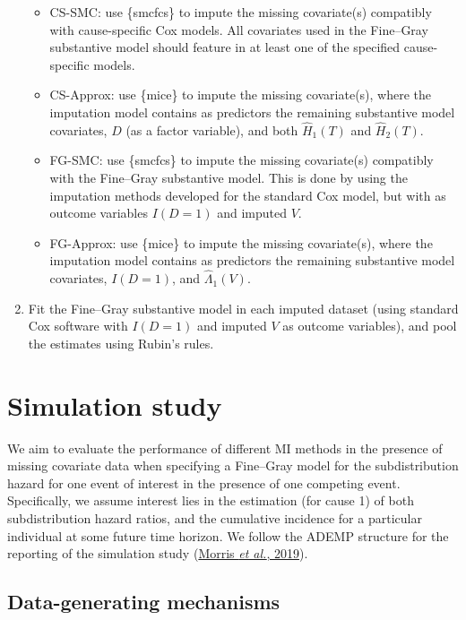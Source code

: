 \documentclass[
  letterpaper,
  DIV=11,
  numbers=noendperiod]{scrreprt}
\providecommand{\tightlist}{%
  \setlength{\itemsep}{0pt}\setlength{\parskip}{0pt}}\usepackage{longtable,booktabs,array}
\begin{document}
\begin{enumerate}
  \begin{itemize}
  \tightlist
  \item
    CS-SMC: use \{smcfcs\} to impute the missing covariate(s) compatibly
    with cause-specific Cox models. All covariates used in the
    Fine--Gray substantive model should feature in at least one of the
    specified cause-specific models.
  \item
    CS-Approx: use \{mice\} to impute the missing covariate(s), where
    the imputation model contains as predictors the remaining
    substantive model covariates, \(D\) (as a factor variable), and both
    \(\hat{H}_1(T)\) and \(\hat{H}_2(T)\).
  \item
    FG-SMC: use \{smcfcs\} to impute the missing covariate(s) compatibly
    with the Fine--Gray substantive model. This is done by using the
    imputation methods developed for the standard Cox model, but with as
    outcome variables \(I(D = 1)\) and imputed \(V\).
  \item
    FG-Approx: use \{mice\} to impute the missing covariate(s), where
    the imputation model contains as predictors the remaining
    substantive model covariates, \(I(D = 1)\), and
    \(\hat{\Lambda}_1(V)\).
  \end{itemize}
\item
  Fit the Fine--Gray substantive model in each imputed dataset (using
  standard Cox software with \(I(D = 1)\) and imputed \(V\) as outcome
  variables), and pool the estimates using Rubin's rules.
\end{enumerate}

\hypertarget{sec-sim-study}{%
\section{Simulation study}\label{sec-sim-study}}

We aim to evaluate the performance of different MI methods in the
presence of missing covariate data when specifying a Fine--Gray model
for the subdistribution hazard for one event of interest in the presence
of one competing event. Specifically, we assume interest lies in the
estimation (for cause 1) of both subdistribution hazard ratios, and the
cumulative incidence for a particular individual at some future time
horizon. We follow the ADEMP structure for the reporting of the
simulation study
(\protect\hyperlink{ref-morrisUsingSimulationStudies2019}{Morris
\emph{et al.}, 2019}).

\hypertarget{data-generating-mechanisms-1}{%
\subsection{Data-generating
mechanisms}\label{data-generating-mechanisms-1}}
\end{document}
